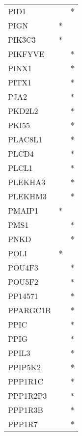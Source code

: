 \begin{longtable}{lcc}
PID1            &                &          * \\
PIGN            &              * &            \\
PIK3C3          &              * &            \\
PIKFYVE         &                &          * \\
PINX1           &                &          * \\
PITX1           &                &          * \\
PJA2            &                &          * \\
PKD2L2          &                &          * \\
PKI55           &                &          * \\
PLAC8L1         &                &          * \\
PLCD4           &                &          * \\
PLCL1           &                &          * \\
PLEKHA3         &                &          * \\
PLEKHM3         &                &          * \\
PMAIP1          &              * &            \\
PMS1            &                &          * \\
PNKD            &                &          * \\
POLI            &              * &            \\
POU4F3          &                &          * \\
POU5F2          &                &          * \\
PP14571         &                &          * \\
PPARGC1B        &                &          * \\
PPIC            &                &          * \\
PPIG            &                &          * \\
PPIL3           &                &          * \\
PPIP5K2         &                &          * \\
PPP1R1C         &                &          * \\
PPP1R2P3        &                &          * \\
PPP1R3B         &                &          * \\
PPP1R7          &                &          * \\

\end{longtable}
